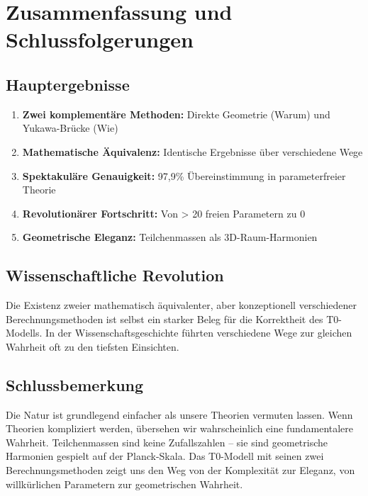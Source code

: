 \documentclass[12pt,a4paper]{article}
\begin{document}
	\section{Zusammenfassung und Schlussfolgerungen}
	\label{sec:summary_conclusions}
	
	\subsection{Hauptergebnisse}
	\label{subsec:main_results}
	
	\begin{enumerate}
		\item \textbf{Zwei komplementäre Methoden:} Direkte Geometrie (Warum) und Yukawa-Brücke (Wie)
		\item \textbf{Mathematische Äquivalenz:} Identische Ergebnisse über verschiedene Wege
		\item \textbf{Spektakuläre Genauigkeit:} 97,9\% Übereinstimmung in parameterfreier Theorie
		\item \textbf{Revolutionärer Fortschritt:} Von > 20 freien Parametern zu 0
		\item \textbf{Geometrische Eleganz:} Teilchenmassen als 3D-Raum-Harmonien
	\end{enumerate}
	
	\subsection{Wissenschaftliche Revolution}
	\label{subsec:scientific_revolution}
	
	Die Existenz zweier mathematisch äquivalenter, aber konzeptionell verschiedener Berechnungsmethoden ist selbst ein starker Beleg für die Korrektheit des T0-Modells. In der Wissenschaftsgeschichte führten verschiedene Wege zur gleichen Wahrheit oft zu den tiefsten Einsichten.
	
	\subsection{Schlussbemerkung}
	\label{subsec:final_remark}
	
	Die Natur ist grundlegend einfacher als unsere Theorien vermuten lassen. Wenn Theorien kompliziert werden, übersehen wir wahrscheinlich eine fundamentalere Wahrheit. Teilchenmassen sind keine Zufallszahlen -- sie sind geometrische Harmonien gespielt auf der Planck-Skala. Das T0-Modell mit seinen zwei Berechnungsmethoden zeigt uns den Weg von der Komplexität zur Eleganz, von willkürlichen Parametern zur geometrischen Wahrheit.
	
\end{document}
